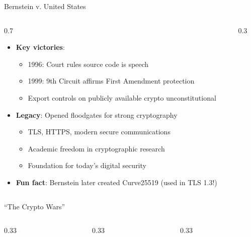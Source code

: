 \ifdefined\PRESENTATION\else\PassOptionsToClass{handout}{beamer}\fi\documentclass[aspectratio=169, lualatex]{beamer}
\begin{document}
\begin{frame}{Bernstein v. United States}
	\begin{columns}[c]
		\begin{column}{0.7\textwidth}
			\begin{itemize}
				\item \textbf{Key victories}:
				      \begin{itemize}
					      \item 1996: Court rules source code is speech
					      \item 1999: 9th Circuit affirms First Amendment protection
					      \item Export controls on publicly available crypto unconstitutional
				      \end{itemize}
				\item \textbf{Legacy}: Opened floodgates for strong cryptography
				      \begin{itemize}
					      \item TLS, HTTPS, modern secure communications
					      \item Academic freedom in cryptographic research
					      \item Foundation for today's digital security
				      \end{itemize}
				\item \textbf{Fun fact}: Bernstein later created Curve25519 (used in TLS 1.3!)
			\end{itemize}
		\end{column}
		\begin{column}{0.3\textwidth}
		\end{column}
	\end{columns}
\end{frame}

\begin{frame}{``The Crypto Wars''}
	\begin{columns}[c]
		\begin{column}{0.33\textwidth}
		\end{column}
		\begin{column}{0.33\textwidth}
		\end{column}
		\begin{column}{0.33\textwidth}
		\end{column}
	\end{columns}
\end{frame}
\end{document}
